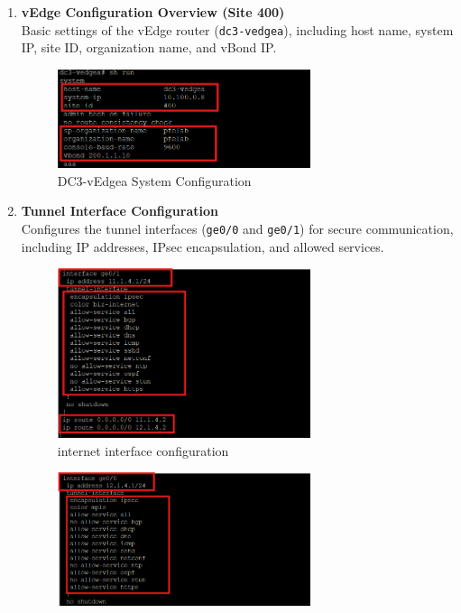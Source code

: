 \documentclass[12pt,english]{report}
\begin{document}
\begin{enumerate}
    \item \textbf{vEdge Configuration Overview (Site 400)} \\
    Basic settings of the vEdge router (\texttt{dc3-vedgea}), including host name, system IP, site ID, organization name, and vBond IP.
\begin{figure}[H]
    \centering
    \includegraphics[width= 0.7\textwidth]{chapitre 3/3vedgea1.png}
    \caption{DC3-vEdgea System Configuration}
    \label{fig: DC3-vEdgea System Configuration}
\end{figure}
    \item \textbf{Tunnel Interface Configuration} \\
    Configures the tunnel interfaces (\texttt{ge0/0} and \texttt{ge0/1}) for secure communication, including IP addresses, IPsec encapsulation, and allowed services.
\begin{figure}[H]
    \centering
    \includegraphics[width= 0.7\textwidth]{chapitre 3/3vedgea4.png}
    \caption{internet interface configuration}
    \label{fig: internet interface configuration}
\end{figure}
\begin{figure}[H]
    \centering
    \includegraphics[width= 0.7\textwidth]{chapitre 3/3vedgea3.png}

\end{figure}
\end{enumerate}
\end{document}
